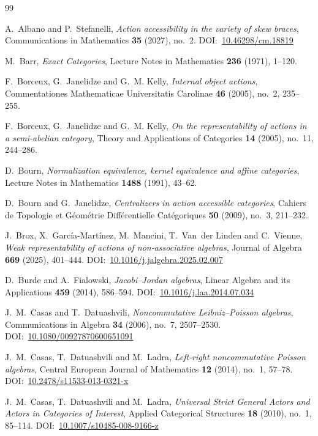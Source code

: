 \documentclass[reqno,a4paper]{amsart}
\renewcommand{\doi}[1]{DOI:~\href{https://doi.org/#1}{#1}}
\theoremstyle{plain}
\theoremstyle{definition}
\theoremstyle{remark}
\numberwithin{equation}{section}
\begin{document}
\begin{thebibliography}{99}

A.~Albano and P.~Stefanelli, \emph{Action accessibility in the variety of skew braces}, Communications in Mathematics \textbf{35} (2027), no.~2. \doi{10.46298/cm.18819}

M.~Barr, \emph{Exact Categories}, Lecture Notes in Mathematics \textbf{236} (1971), 1--120.

F.~Borceux, G.~Janelidze and G.~M. Kelly, \emph{Internal object actions}, Commentationes Mathematicae Universitatis Carolinae \textbf{46} (2005), no.~2, 235--255.

F.~Borceux, G.~Janelidze and G.~M. Kelly, \emph{On the representability of actions in a semi-abelian category}, Theory and Applications of Categories \textbf{14} (2005), no.~11, 244--286.

D.~Bourn, \emph{Normalization equivalence, kernel equivalence and affine categories}, Lecture Notes in Mathematics \textbf{1488} (1991), 43--62.

D.~Bourn and G.~Janelidze, \emph{Centralizers in action accessible categories}, Cahiers de Topologie et G\'eom\'etrie Diff\'erentielle Cat\'egoriques \textbf{50} (2009), no.~3, 211--232.

J.~Brox, X.~García-Martínez, M.~Mancini, T.~Van~der Linden and C.~Vienne, \emph{Weak representability of actions of non-associative algebras}, Journal of Algebra \textbf{669} (2025), 401--444. \doi{10.1016/j.jalgebra.2025.02.007}

D.~Burde and A.~Fialowski, \emph{Jacobi--Jordan algebras}, Linear Algebra and its Applications \textbf{459} (2014), 586--594.
\doi{10.1016/j.laa.2014.07.034}

J.~M.~Casas and T.~Datuashvili, \emph{Noncommutative Leibniz--Poisson algebras}, Communications in Algebra \textbf{34} (2006), no.~7, 2507--2530.
\doi{10.1080/00927870600651091}

J.~M.~Casas, T.~Datuashvili and M.~Ladra, \emph{Left-right noncommutative Poisson algebras}, Central European Journal of Mathematics \textbf{12} (2014), no.~1, 57--78.
\doi{10.2478/s11533-013-0321-x}

J.~M.~Casas, T.~Datuashvili and M.~Ladra, \emph{Universal Strict General Actors and Actors in Categories of Interest}, Applied Categorical Structures \textbf{18} (2010), no.~1, 85--114. \doi{10.1007/s10485-008-9166-z}


\end{thebibliography}
\end{document}
